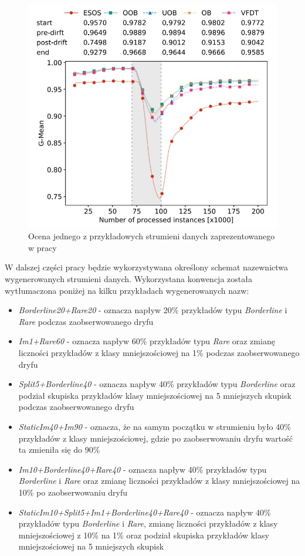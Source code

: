 \begin{figure}[h]
    \centering
    \includegraphics[width=13cm]{figures/drift_example.JPG}
    \caption{Ocena jednego z przykładowych strumieni danych zaprezentowanego w pracy \cite{Article:TypyPrzykladow}}\label{Figure:DriftExample}
\end{figure}

W dalszej części pracy będzie wykorzystywana określony schemat nazewnictwa wygenerowanych strumieni danych. Wykorzystana konwencja została wytłumaczona poniżej na kilku przykładach wygenerowanych nazw:

\begin{itemize}
    \item \textit{Borderline20+Rare20} - oznacza napływ 20\% przykładów typu \textit{Borderline} i \textit{Rare} podczas zaobserwowanego dryfu
    \item \textit{Im1+Rare60} - oznacza napływ 60\% przykładów typu \textit{Rare} oraz zmianę liczności przykładów z klasy mniejszościowej na 1\% podczas zaobserwowanego dryfu
    \item \textit{Split5+Borderline40} - oznacza napływ 40\% przykładów typu \textit{Borderline} oraz podział skupiska przykładów klasy mniejszościowej na 5 mniejszych skupisk podczas zaobserwowanego dryfu
    \item \textit{StaticIm40+Im90} - oznacza, że na samym początku w strumieniu było 40\% przykładów z klasy mniejszościowej, gdzie po zaobserwowaniu dryfu wartość ta zmieniła się do 90\%
    \item \textit{Im10+Borderline40+Rare40} - oznacza napływ 40\% przykładów typu \textit{Borderline} i \textit{Rare} oraz zmianę liczności przykładów z klasy mniejszościowej na 10\% po zaobserwowaniu dryfu
    \item \textit{StaticIm10+Split5+Im1+Borderline40+Rare40} - oznacza napływ 40\% przykładów typu \textit{Borderline} i \textit{Rare}, zmianę liczności przykładów z klasy mniejszościowej z 10\% na 1\% oraz podział skupiska przykładów klasy mniejszościowej na 5 mniejszych skupisk
\end{itemize}